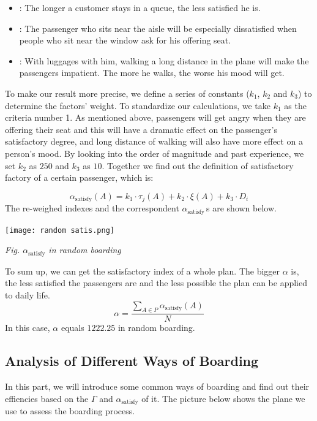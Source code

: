 \documentclass{article}
\theoremstyle{definition}
\theoremstyle{remark}
\numberwithin{equation}{section}
\begin{document}
	\begin{itemize}
		\item {}: The longer a customer stays in a queue, the less satisfied he is.
		\item {}: The passenger who sits near the aisle will be especially dissatisfied when people who sit near the window ask for his offering seat.
		\item {}: With luggages with him, walking a long distance in the plane will make the passengers impatient. The more he walks, the worse his mood will get.
	\end{itemize}
	To make our result more precise, we define a series of constants ($k_1$, $k_2$ and $k_3$) to determine the factors' weight. To standardize our calculations, we take $k_1$ as the criteria number 1. As mentioned above, passengers will get angry when they are offering their seat and this will have a dramatic effect on the passenger's satisfactory degree, and long distance of walking will also have more effect on a person's mood. By looking into the order of magnitude and past experience, we set \(k_2\) as \(250\) and \(k_3\) as \(10\).
	Together we find out the definition of satisfactory factory of a certain passenger, which is:

	$$\alpha_\text{satisfy}(A)=k_1\cdot \tau_j(A)+k_2\cdot\xi\left(A\right)+k_3\cdot D_i$$
	The re-weighed indexes and the correspondent \(\alpha_{\mathrm{satisfy}}\,\)s are shown below.
	\begin{center}
		\texttt{[image: random satis.png]}

		\small\textit{Fig. \(\alpha_{\mathrm{satisfy}}\) in random boarding}
	\end{center}
	To sum up, we can get the satisfactory index of a whole plan. The bigger $\alpha$ is, the less satisfied the passengers are and the less possible the plan can be applied to daily life.
	$$\alpha=\dfrac{\sum\limits_{A\in P} \alpha_\text{satisfy}(A)}{N}$$
	In this case, \(\alpha\) equals \(1222.25\) in random boarding.

	\subsection{Analysis of Different Ways of Boarding}
	In this part, we will introduce some common ways of boarding and find out their effiencies based on the $\Gamma$ and $\alpha_\text{satisfy}$ of it. The picture below shows the plane we use to assess the boarding process.
	
\end{document}
